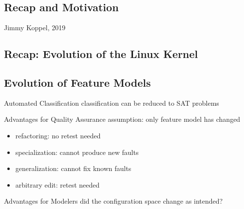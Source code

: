 \subsection{Recap and Motivation}
\begin{frame}{\insertsubsection}
	\begin{mycolumns}[columns=3,widths={25,50},animation=none]
	\mynextcolumn
		\begin{note}{Jimmy Koppel, 2019}
		\end{note}
	\mynextcolumn
	\end{mycolumns}
\end{frame}


\subsection{Recap: Evolution of the Linux Kernel}

\subsection{Evolution of Feature Models}
\begin{frame}{\myframetitle{} \mytitlesource{\reasoningfme}}
	\begin{mycolumns}
		\pause\begin{definition}{Automated Classification}
			classification can be reduced to SAT problems
		\end{definition}
	\mynextcolumn
		\pause\begin{note}{Advantages for Quality Assurance}
			assumption: only feature model has changed
			\begin{itemize}
				\item refactoring: no retest needed
				\item specialization: cannot produce new faults
				\item generalization: cannot fix known faults
				\item arbitrary edit: retest needed
			\end{itemize}
		\end{note}
		\pause\begin{note}{Advantages for Modelers}
			did the configuration space change as intended?
		\end{note}
	\end{mycolumns}
\end{frame}

